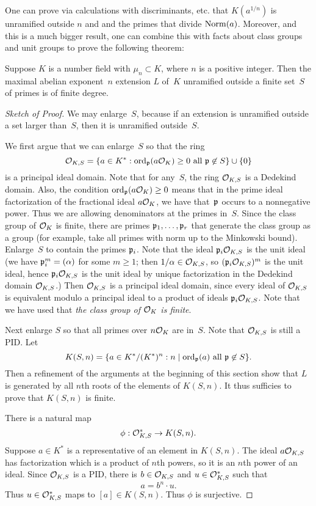 One can prove via calculations with discriminants, etc. that
$K(a^{1/n})$ is unramified outside $n$ and and the primes that divide
$\operatorname{Norm}(a)$.  Moreover, and this is a much bigger result, one can
combine this with facts about class groups and unit groups to prove
the following theorem:
\begin{theorem}\label{thm:maxunramfin}
  Suppose $K$ is a number field with $\mu_n\subset K$, where $n$ is a
  positive integer.  Then the maximal abelian exponent~$n$ extension $L$
  of~$K$ unramified outside a finite set~$S$ of primes is of finite
  degree.
\end{theorem}
\begin{proof}[Sketch of Proof]
We may enlarge~$S$, because if an extension is unramified outside
a set larger than~$S$, then it is unramified outside~$S$.

We first argue that we can enlarge~$S$ so that the ring 
$$
 \mathcal{O}_{K,S} = \{a \in K^* :  \operatorname{ord}_{\mathfrak{p}}(a\mathcal{O}_K) \geq 0 \text{ all } \mathfrak{p}\not\in S\}
    \cup\{0\}
$$
is a principal ideal domain.  
Note that for any~$S$, the ring $\mathcal{O}_{K,S}$ is a Dedekind domain.
Also, the condition $ \operatorname{ord}_{\mathfrak{p}}(a\mathcal{O}_K) \geq 0$
means that in the prime ideal factorization of the fractional ideal
$a\mathcal{O}_K$, we have that~$\mathfrak{p}$ occurs to a nonnegative power.  Thus we are
allowing denominators at the primes in~$S$.  Since the class group of
$\mathcal{O}_K$ is finite, there are primes $\mathfrak{p}_1,\ldots, \mathfrak{p}_r$ that generate
the class group as a group (for example, take all primes with norm up to
the Minkowski bound).  Enlarge~$S$ to contain the primes $\mathfrak{p}_i$.
Note that the ideal $\mathfrak{p}_i\mathcal{O}_{K,S}$ is the unit ideal (we have 
$\mathfrak{p}_i^m=(\alpha)$ for some $m\geq 1$;  then $1/\alpha \in \mathcal{O}_{K,S}$,
so $(\mathfrak{p}_i\mathcal{O}_{K,S})^m$ is the unit ideal, hence $\mathfrak{p}_i \mathcal{O}_{K,S}$
is the unit ideal by unique factorization in the Dedekind
domain $\mathcal{O}_{K,S}$.)
Then $\mathcal{O}_{K,S}$ is a principal ideal domain, since every ideal
of $\mathcal{O}_{K,S}$ is equivalent modulo a principal ideal 
to a product of ideals $\mathfrak{p}_i\mathcal{O}_{K,S}$.   Note that we have used
that {\em the class group of $\mathcal{O}_K$ is finite}.

Next enlarge $S$ so that all primes over $n\mathcal{O}_K$ are in~$S$.
Note that $\mathcal{O}_{K,S}$ is still a PID.  Let
$$
 K(S,n) = \{a \in K^*/(K^*)^n : n \mid \operatorname{ord}_{\mathfrak{p}}(a) \text{ all } \mathfrak{p}\not\in S\}.
$$
Then a refinement of the arguments at the beginning of
this section show that $L$ is generated by all $n$th roots
of the elements of $K(S,n)$.  It thus sufficies to prove
that $K(S,n)$ is finite.

There is a natural map 
$$
\phi: \mathcal{O}_{K,S}^* \to K(S,n).
$$ 
Suppose $a\in K^*$ is a representative of an element in $K(S,n)$.
The ideal $a \mathcal{O}_{K,S}$ has factorization which is a product of $n$th
powers, so it is an $n$th power of an ideal. Since $\mathcal{O}_{K,S}$ is a PID,
there is $b\in \mathcal{O}_{K,S}$ and $u\in \mathcal{O}_{K,S}^*$ such that
$$
   a = b^n \cdot u.
$$
Thus $u\in \mathcal{O}_{K,S}^*$ maps to $[a] \in K(S,n)$.  Thus $\phi$
is surjective.


\end{proof}
